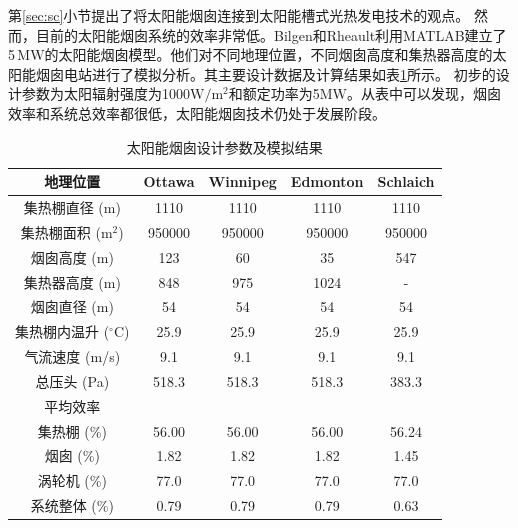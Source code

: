 第\ref{sec:sc}小节提出了将太阳能烟囱连接到太阳能槽式光热发电技术的观点。
然而，目前的太阳能烟囱系统的效率非常低。Bilgen和Rheault利用MATLAB建立了5$\,\mathrm{MW}$的太阳能烟囱模型\cite{Bilgen2005}。他们对不同地理位置，不同烟囱高度和集热器高度的太阳能烟囱电站进行了模拟分析。其主要设计数据及计算结果如表\ref{tab:sc}所示。 初步的设计参数为太阳辐射强度为1000$\mathrm{W/m^2}$和额定功率为5$\mathrm{MW}$。从表中可以发现，烟囱效率和系统总效率都很低，太阳能烟囱技术仍处于发展阶段。
\begin{table}[htbp]
\setlength{\abovecaptionskip}{-10pt}
	\caption{太阳能烟囱设计参数及模拟结果}
	\begin{center}
	\begin{tabular}{ccccc}
		\toprule
		地理位置	&Ottawa    &Winnipeg    &Edmonton    &Schlaich\\
		\midrule
		集热棚直径 (m)    &	1110	&	1110	&	1110	&	1110 \\
  集热棚面积 ($\mathrm{m^2}$)    & 950000    & 950000	&	950000	&	950000\\
  烟囱高度 (m)    &123    &60    &    35&    547\\
  集热器高度 (m)    &848    &975    &1024    &    -\\
  烟囱直径 (m)    &54    &54    &54    &54\\
  集热棚内温升 ($\mathrm{^\circ C}$)    &25.9    &25.9    &25.9    &25.9\\
  气流速度 (m/s)&9.1    &9.1    &9.1    &9.1\\
  总压头 (Pa)&518.3    &518.3    &518.3    &383.3\\
  平均效率\\
  集热棚 (\%)    &56.00    &56.00    &56.00    &56.24\\
  烟囱 (\%)    &1.82    &1.82    &1.82    &1.45\\
  涡轮机 (\%)    &77.0    &77.0    &77.0    &77.0\\
  系统整体 (\%)    &0.79    &0.79    &0.79    &0.63\\
		\bottomrule
	\end{tabular}
	\end{center}
	\label{tab:sc}
\end{table}

